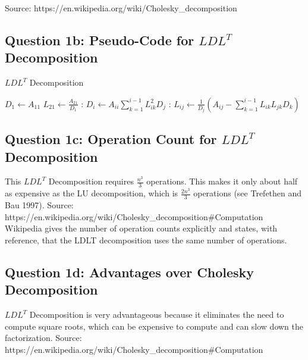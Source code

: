 \documentclass[11pt,a4paper,oneside]{article}
\begin{document}
Source: https://en.wikipedia.org/wiki/Cholesky\_decomposition

\subsection{Question 1b: Pseudo-Code for $LDL^{T}$ Decomposition}
\begin{algorithm}
\caption{$LDL^{T}$ Decomposition}\label{euclid}
\begin{algorithmic}[1]
	\State $D_1 \gets A_{11}$
	\State $L_{21} \gets \frac{A_{21}}{D_1}$
	:
		\State $D_i \gets A_{ii} \sum^{i-1}_{k=1} L^{2}_{ik} D_j$
		:
			\State $L_{ij} \gets \frac{1}{D_j} (A_{ij} - \sum^{i-1}_{k=1} L_{ik} L_{jk} D_k)$
		\EndFor
	\EndFor
\EndProcedure
\end{algorithmic}
\end{algorithm}

\subsection{Question 1c: Operation Count for $LDL^{T}$ Decomposition}
This $LDL^{T}$ Decomposition requires $\frac{n^3}{3}$ operations. This makes it only about half
as expensive as the LU decomposition, which is $\frac{2n^3}{3}$ operations (see Trefethen and Bau 1997).
\hfill \break
\hfill \break \noindent
Source: https://en.wikipedia.org/wiki/Cholesky\_decomposition\#Computation \\
Wikipedia gives the number of operation counts explicitly and states, with reference, that the LDLT
decomposition uses the same number of operations.

\subsection{Question 1d: Advantages over Cholesky Decomposition}
$LDL^{T}$ Decomposition is very advantageous because it eliminates the need to compute square roots,
which can be expensive to compute and can slow down the factorization.
\hfill \break 
\hfill \break \noindent
Source: https://en.wikipedia.org/wiki/Cholesky\_decomposition\#Computation
\end{document}
